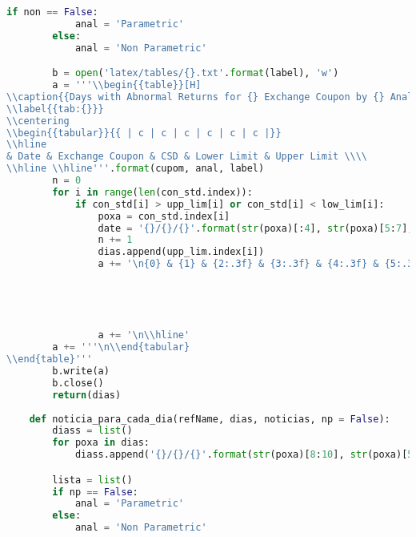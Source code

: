 \begin{lstlisting}[language=Python]
        if non == False:
            anal = 'Parametric'
        else:
            anal = 'Non Parametric'

        b = open('latex/tables/{}.txt'.format(label), 'w')
        a = '''\\begin{{table}}[H]
\\caption{{Days with Abnormal Returns for {} Exchange Coupon by {} Analysis}}
\\label{{tab:{}}}
\\centering
\\begin{{tabular}}{{ | c | c | c | c | c | c |}}
\\hline
& Date & Exchange Coupon & CSD & Lower Limit & Upper Limit \\\\
\\hline \\hline'''.format(cupom, anal, label)
        n = 0
        for i in range(len(con_std.index)):
            if con_std[i] > upp_lim[i] or con_std[i] < low_lim[i]:
                poxa = con_std.index[i]
                date = '{}/{}/{}'.format(str(poxa)[:4], str(poxa)[5:7], str(poxa)[8:10])
                n += 1
                dias.append(upp_lim.index[i])
                a += '\n{0} & {1} & {2:.3f} & {3:.3f} & {4:.3f} & {5:.3f}\\\\'.format(n,
                                                                                      date,
                                                                                      exc_cou[i],
                                                                                      con_std[i],
                                                                                      low_lim[i],
                                                                                      upp_lim[i])
                a += '\n\\hline'
        a += '''\n\\end{tabular}
\\end{table}'''
        b.write(a)
        b.close()
        return(dias)
    
    def noticia_para_cada_dia(refName, dias, noticias, np = False):
        diass = list()
        for poxa in dias:
            diass.append('{}/{}/{}'.format(str(poxa)[8:10], str(poxa)[5:7], str(poxa)[:4]))

        lista = list()
        if np == False:
            anal = 'Parametric'
        else:
            anal = 'Non Parametric'


\end{lstlisting}
